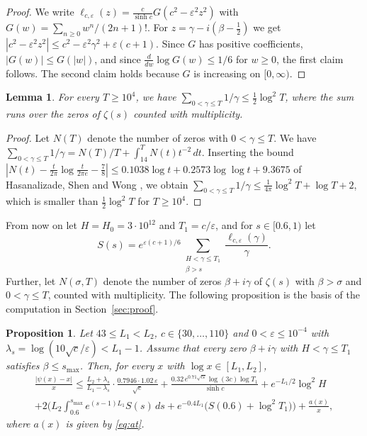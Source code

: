 \documentclass[11pt]{amsart}
\numberwithin{equation}{section}
\newtheorem{lemma}[theorem]{Lemma}
\newtheorem{proposition}[theorem]{Proposition}
\theoremstyle{definition}
\theoremstyle{remark}
\newcommand{\eps}{\varepsilon}
\begin{document}
\begin{proof}
We write $\ell_{c,\eps}(z) = \frac{c}{\sinh c}G(c^2 - \eps^2z^2)$ with $G(w) = \sum_{n\geq0}w^n/(2n+1)!$.
For $z = \gamma - i(\beta - \frac12)$ we get $|c^2 - \eps^2z^2| \leq c^2 - \eps^2\gamma^2 + \eps(c+1)$.
Since $G$ has positive coefficients, $|G(w)| \leq G(|w|)$, and since $\frac{d}{dw}\log G(w) \leq 1/6$ for $w \geq 0$, the first claim follows.
The second claim holds because $G$ is increasing on $[0,\infty)$.
\end{proof}

\begin{lemma}\label{lem:sumrecip}
For every $T \geq 10^4$, we have $\sum_{0 < \gamma \leq T}1/\gamma \leq \frac12\log^2T$, where the sum runs over the zeros of $\zeta(s)$ counted with multiplicity.
\end{lemma}

\begin{proof}
Let $N(T)$ denote the number of zeros with $0 < \gamma \leq T$.
We have $\sum_{0<\gamma\leq T}1/\gamma = N(T)/T + \int_{14}^T N(t)t^{-2}\,dt$.
Inserting the bound $|N(t) - \frac{t}{2\pi}\log\frac{t}{2\pi e} - \frac78| \leq 0.1038\log t + 0.2573\log\log t + 9.3675$ of Hasanalizade, Shen and Wong \cite{HSW}, we obtain $\sum_{0<\gamma\leq T}1/\gamma \leq \frac{1}{4\pi}\log^2T + \log T + 2$, which is smaller than $\frac12\log^2T$ for $T \geq 10^4$.
\end{proof}

From now on let $H = H_0 = 3\cdot10^{12}$ and $T_1 = c/\eps$, and for $s \in [0.6, 1)$ let
\[
S(s) = e^{\eps(c+1)/6}\sum_{\substack{H < \gamma \leq T_1\\ \beta > s}}\frac{\ell_{c,\eps}(\gamma)}{\gamma}.
\]
Further, let $N(\sigma, T)$ denote the number of zeros $\beta + i\gamma$ of $\zeta(s)$ with $\beta > \sigma$ and $0 < \gamma \leq T$, counted with multiplicity.
The following proposition is the basis of the computation in Section~\ref{sec:proof}.

\begin{proposition}\label{prop:master}
Let $43 \leq L_1 < L_2$, $c \in \{30, \ldots, 110\}$ and $0 < \eps \leq 10^{-4}$ with $\lambda_s = \log(10\sqrt c/\eps) < L_1 - 1$.
Assume that every zero $\beta + i\gamma$ with $H < \gamma \leq T_1$ satisfies $\beta \leq s_{\max}$.
Then, for every $x$ with $\log x \in [L_1, L_2]$,
\begin{multline}\label{eq:master}
\frac{|\psi(x) - x|}{x} \leq \frac{L_2 + \lambda_s}{L_1 - \lambda_s}\cdot\frac{0.7946\cdot1.02\,\eps}{\sqrt c} + \frac{0.32\,e^{0.71\sqrt{c\eps}}\log(3c)\log T_1}{\sinh c} + e^{-L_1/2}\log^2H\\
+ 2\Big(L_2\int_{0.6}^{s_{\max}}e^{(s-1)L_1}S(s)\,ds + e^{-0.4L_1}\big(S(0.6) + \log^2T_1\big)\Big) + \frac{a(x)}{x},
\end{multline}
where $a(x)$ is given by \eqref{eq:at}.
\end{proposition}
\end{document}
